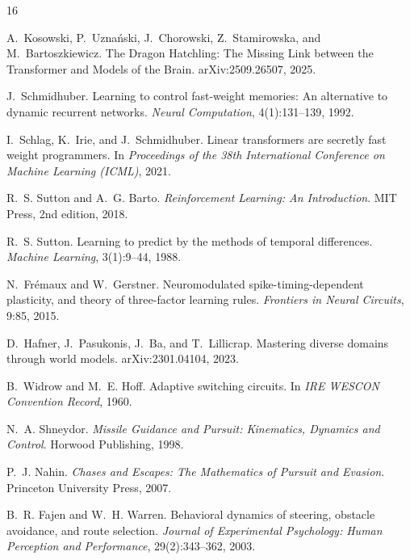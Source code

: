 \documentclass[11pt]{article}
\begin{document}
\begin{thebibliography}{16}

A.~Kosowski, P.~Uzna\'nski, J.~Chorowski, Z.~Stamirowska, and M.~Bartoszkiewicz.
\newblock The Dragon Hatchling: The Missing Link between the Transformer and Models of the
  Brain.
\newblock arXiv:2509.26507, 2025.

J.~Schmidhuber.
\newblock Learning to control fast-weight memories: An alternative to dynamic recurrent
  networks.
\newblock \emph{Neural Computation}, 4(1):131--139, 1992.

I.~Schlag, K.~Irie, and J.~Schmidhuber.
\newblock Linear transformers are secretly fast weight programmers.
\newblock In \emph{Proceedings of the 38th International Conference on Machine Learning
  (ICML)}, 2021.

R.~S. Sutton and A.~G. Barto.
\newblock \emph{Reinforcement Learning: An Introduction}.
\newblock MIT Press, 2nd edition, 2018.

R.~S. Sutton.
\newblock Learning to predict by the methods of temporal differences.
\newblock \emph{Machine Learning}, 3(1):9--44, 1988.

N.~Fr\'emaux and W.~Gerstner.
\newblock Neuromodulated spike-timing-dependent plasticity, and theory of three-factor learning
  rules.
\newblock \emph{Frontiers in Neural Circuits}, 9:85, 2015.

D.~Hafner, J.~Pasukonis, J.~Ba, and T.~Lillicrap.
\newblock Mastering diverse domains through world models.
\newblock arXiv:2301.04104, 2023.

B.~Widrow and M.~E. Hoff.
\newblock Adaptive switching circuits.
\newblock In \emph{IRE WESCON Convention Record}, 1960.

N.~A. Shneydor.
\newblock \emph{Missile Guidance and Pursuit: Kinematics, Dynamics and Control}.
\newblock Horwood Publishing, 1998.

P.~J. Nahin.
\newblock \emph{Chases and Escapes: The Mathematics of Pursuit and Evasion}.
\newblock Princeton University Press, 2007.

B.~R. Fajen and W.~H. Warren.
\newblock Behavioral dynamics of steering, obstacle avoidance, and route selection.
\newblock \emph{Journal of Experimental Psychology: Human Perception and Performance},
  29(2):343--362, 2003.


\end{thebibliography}
\end{document}
